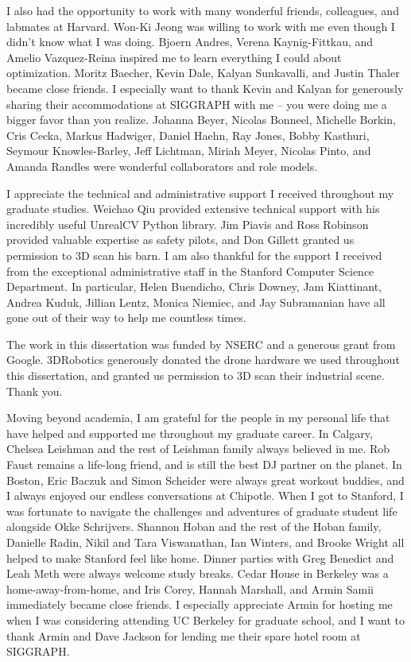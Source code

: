 I also had the opportunity to work with many wonderful friends, colleagues, and labmates at Harvard.
Won-Ki Jeong was willing to work with me even though I didn't know what I was doing.
Bjoern Andres, Verena Kaynig-Fittkau, and Amelio Vazquez-Reina inspired me to learn everything I could about optimization.
Moritz Baecher, Kevin Dale, Kalyan Sunkavalli, and Justin Thaler became close friends.
I especially want to thank Kevin and Kalyan for generously sharing their accommodations at SIGGRAPH with me -- you were doing me a bigger favor than you realize.  
Johanna Beyer, Nicolas Bonneel, Michelle Borkin, Cris Cecka, Markus Hadwiger, Daniel Haehn, Ray Jones, Bobby Kasthuri, Seymour Knowles-Barley,  Jeff Lichtman, Miriah Meyer, Nicolas Pinto, and Amanda Randles were wonderful collaborators and role models.

I appreciate the technical and administrative support I received throughout my graduate studies.
Weichao Qiu provided extensive technical support with his incredibly useful UnrealCV Python library.
Jim Piavis and Ross Robinson provided valuable expertise as safety pilots, and Don Gillett granted us permission to 3D scan his barn.
I am also thankful for the support I received from the exceptional administrative staff in the Stanford Computer Science Department.
In particular, Helen Buendicho, Chris Downey, Jam Kiattinant, Andrea Kuduk, Jillian Lentz, Monica Niemiec, and Jay Subramanian have all gone out of their way to help me countless times.

The work in this dissertation was funded by NSERC and a generous grant from Google.
3DRobotics generously donated the drone hardware we used throughout this dissertation, and granted us permission to 3D scan their industrial scene.
Thank you.

Moving beyond academia, I am grateful for the people in my personal life that have helped and supported me throughout my graduate career.
In Calgary, Chelsea Leishman and the rest of Leishman family always believed in me.
Rob Faust remains a life-long friend, and is still the best DJ partner on the planet.
In Boston, Eric Baczuk and Simon Scheider were always great workout buddies, and I always enjoyed our endless conversations at Chipotle.
When I got to Stanford, I was fortunate to navigate the challenges and adventures of graduate student life alongside Okke Schrijvers.
Shannon Hoban and the rest of the Hoban family, Danielle Radin, Nikil and Tara Viswanathan, Ian Winters, and Brooke Wright all helped to make Stanford feel like home.
Dinner parties with Greg Benedict and Leah Meth were always welcome study breaks.
Cedar House in Berkeley was a home-away-from-home, and Iris Corey, Hannah Marshall, and Armin Samii immediately became close friends.
I especially appreciate Armin for hosting me when I was considering attending UC Berkeley for graduate school, and I want to thank Armin and Dave Jackson for lending me their spare hotel room at SIGGRAPH.


